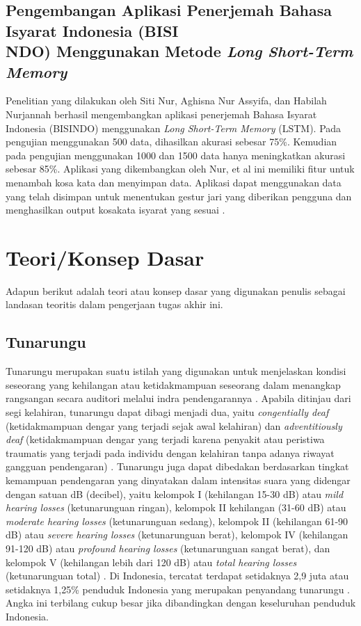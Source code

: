 \subsection{Pengembangan Aplikasi Penerjemah Bahasa Isyarat Indonesia (BISI\\NDO) Menggunakan Metode \textit{Long Short-Term Memory}}
Penelitian yang dilakukan oleh Siti Nur, Aghisna Nur Assyifa, dan Habilah Nurjannah berhasil mengembangkan aplikasi penerjemah Bahasa Isyarat Indonesia (BISINDO) menggunakan \emph{Long Short-Term Memory} (LSTM). Pada pengujian menggunakan 500 data, dihasilkan akurasi sebesar 75\%. Kemudian pada pengujian menggunakan 1000 dan 1500 data hanya meningkatkan akurasi sebesar 85\%. Aplikasi yang dikembangkan oleh Nur, et al ini memiliki fitur untuk menambah kosa kata dan menyimpan data. Aplikasi dapat menggunakan data yang telah disimpan untuk menentukan gestur jari yang diberikan pengguna dan menghasilkan output kosakata isyarat yang sesuai \parencite{nur2023}.

\newpage

\section{Teori/Konsep Dasar}
Adapun berikut adalah teori atau konsep dasar yang digunakan penulis sebagai landasan teoritis dalam pengerjaan tugas akhir ini.

\subsection{Tunarungu} 

Tunarungu merupakan suatu istilah yang digunakan untuk menjelaskan kondisi seseorang yang kehilangan atau ketidakmampuan seseorang dalam menangkap rangsangan secara auditori melalui indra pendengarannya \parencite{somantri2006}. Apabila ditinjau dari segi kelahiran, tunarungu dapat dibagi menjadi dua, yaitu \emph{congentially deaf} (ketidakmampuan dengar yang terjadi sejak awal kelahiran) dan \emph{adventitiously deaf} (ketidakmampuan dengar yang terjadi karena penyakit atau peristiwa traumatis yang terjadi pada individu dengan kelahiran tanpa adanya riwayat gangguan pendengaran) \parencite{hallahan2009}. Tunarungu juga dapat dibedakan berdasarkan tingkat kemampuan pendengaran yang dinyatakan dalam intensitas suara yang didengar dengan satuan dB (decibel), yaitu kelompok I (kehilangan 15-30 dB) atau \emph{mild hearing losses} (ketunarunguan ringan), kelompok II kehilangan (31-60 dB) atau \emph{moderate hearing losses} (ketunarunguan sedang), kelompok II (kehilangan 61-90 dB) atau \emph{severe hearing losses} (ketunarunguan berat), kelompok IV (kehilangan 91-120 dB) atau \emph{profound hearing losses} (ketunarunguan sangat berat), dan kelompok V (kehilangan lebih dari 120 dB) atau \emph{total hearing losses} (ketunarunguan total) \parencite{winarsih2007}. Di Indonesia, tercatat terdapat setidaknya 2,9 juta atau setidaknya 1,25\% penduduk Indonesia yang merupakan penyandang tunarungu \parencite{evitasari2015}. Angka ini terbilang cukup besar jika dibandingkan dengan keseluruhan penduduk Indonesia.

